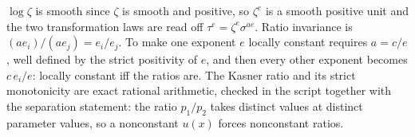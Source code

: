 $\log \zeta$ is smooth since $\zeta$ is smooth and positive, so $\zeta^{e}$ is a smooth positive unit and the two transformation laws are read off $\tau^{e} = \zeta^{e}\sigma^{ae}$. Ratio invariance is $(a e_i)/(a e_j) = e_i/e_j$. To make one exponent $e$ locally constant requires $a = c/e$, well defined by the strict positivity of $e$, and then every other exponent becomes $c\,e_i/e$: locally constant iff the ratios are. The Kasner ratio and its strict monotonicity are exact rational arithmetic, checked in the script together with the separation statement: the ratio $p_1/p_2$ takes distinct values at distinct parameter values, so a nonconstant $u(x)$ forces nonconstant ratios.
